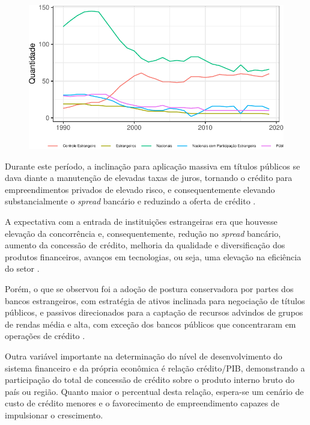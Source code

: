 \documentclass[12pt,12pt,openright,oneside,a4paper,chapter=TITLE,section=TITLE,subsection=TITLE,subsubsection=TITLE,english,french,spanish,portugues,sumario=tradicional]{abntex2}
\begin{document}
\begin{figure}

\begin{center}\includegraphics{12-exportedfigures/capital graphic-1} \end{center}
\label{fig:ev.capital}
\end{figure}

Durante este período, a inclinação para aplicação massiva em títulos públicos
se dava diante a manutenção de elevadas taxas de juros, tornando o crédito para
empreendimentos privados de elevado risco, e consequentemente elevando
substancialmente o \emph{spread} bancário e reduzindo a oferta de crédito
\cite{camargo:2009}.

A expectativa com a entrada de instituições estrangeiras era que houvesse
elevação da concorrência e, consequentemente, redução no \emph{spread} bancário,
aumento da concessão de crédito, melhoria da qualidade e diversificação dos
produtos financeiros, avanços em tecnologias, ou seja, uma elevação na
eficiência do setor \cite{camargo:2009}.

Porém, o que se observou foi a adoção de postura conservadora por partes dos
bancos estrangeiros, com estratégia de ativos inclinada para negociação de
títulos públicos, e passivos direcionados para a captação de recursos advindos
de grupos de rendas média e alta, com exceção dos bancos públicos que
concentraram em operações de crédito \cite{camargo:2009}.

Outra variável importante na determinação do nível de desenvolvimento do sistema financeiro e da própria econômica é relação crédito/PIB, demonstrando a participação do total de concessão de crédito sobre o produto interno bruto do país ou região. Quanto maior o percentual desta relação, espera-se um cenário de custo de crédito menores e o favorecimento de empreendimento capazes de impulsionar o crescimento.
\end{document}

